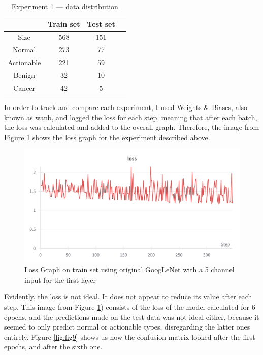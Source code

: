 \begin{table}[ht!]
\centering
\begin{tabular}{|c|c|c|c|}
    \hline
     & Train set & Test set \\ \hline
    Size & 568 & 151 \\ \hline
    Normal & 273 & 77\\ \hline
    Actionable & 221 & 59\\ \hline
    Benign & 32 & 10\\ \hline
    Cancer & 42 & 5\\ \hline
    \end{tabular}
    \caption{Experiment 1 --- data distribution}
    \label{tab:tab1}
\end{table}

In order to track and compare each experiment, I used Weights \& Biases, also known as wanb, and logged the loss for each step, meaning that after each batch, the loss was calculated and added to the overall graph. Therefore, the image from Figure \ref{fig:fig8} shows the loss graph for the experiment described above.

\begin{figure}[!ht]
    \centering
    \includegraphics[width=1\textwidth]{figures/Figure8.png}
    \caption{Loss Graph on train set using original GoogLeNet with a 5 channel input for the first layer}
    \label{fig:fig8}
\end{figure}

Evidently, the loss is not ideal. It does not appear to reduce its value after each step. This image from Figure \ref{fig:fig8}) consists of the loss of the model calculated for 6 epochs, and the predictions made on the test data was not ideal either, because it seemed to only predict normal or actionable types, disregarding the latter ones entirely. Figure \ref{fig:fig9} shows us how the confusion matrix looked after the first epochs, and after the sixth one.

